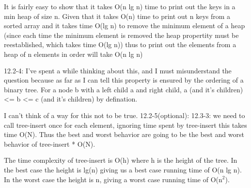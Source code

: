 \documentclass[11pt]{article}
\begin{document}
It is fairly easy to show that it takes O(n lg n) time to print out the keys in
a min heap of size n. Given that it takes O(n) time to print out n keys from a
sorted array and it takes time O(lg n) to remove the minimum element of a heap
(since each time the minimum element is removed the heap propertity
must be reestablished, which takes time O(lg n)) thus to print out the elements
from a heap of n elements in order will take O(n lg n)

12.2-4:
I've spent a while thinking about this, and I must misunderstand the question
because as far as I can tell this property is ensured by the ordering of a
binary tree. For a node b with a left child a and right child,  
a (and it's children) <= b <= c (and it's children) by defination.

I can't think of a way for this not to be true.
12.2-5(optional):
12.3-3:
we need to call tree-insert once for each element, ignoring time spent by
tree-insert this takes time O(N). Thus the best and worst behavior are going to
be the best and worst behavior of tree-insert * O(N).

The time complexity of tree-insert is O(h) where h is the height of the
tree. In the best case the height is lg(n) giving us a best case running time
of O(n lg n). In the worst case the height is n, giving a worst case running
time of O(n$^{\text{2}}$).
\end{document}
